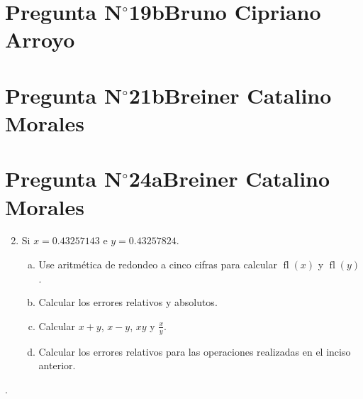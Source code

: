 \section{Pregunta N$^{\circ}$19b\qquad Bruno Cipriano Arroyo}
\section{Pregunta N$^{\circ}$21b\qquad Breiner Catalino Morales}
\section{Pregunta N$^{\circ}$24a\qquad Breiner Catalino Morales}



\begin{frame}

	\begin{enumerate}\setcounter{enumi}{1}
		\item

		      Si $x=0.43257143$ e $y=0.43257824$.

		      \begin{enumerate}[a)]
			      \item\label{q:2.a}

			      Use aritmética de redondeo a cinco cifras para calcular
			      \begin{math}
				      \operatorname{fl}\left(x\right)
			      \end{math}
			      y
			      \begin{math}
				      \operatorname{fl}\left(y\right)
			      \end{math}.

			      \item\label{q:2.b}

			      Calcular los errores relativos y absolutos.

			      \item\label{q:2.c}

			      Calcular $x+y$, $x-y$, $xy$ y $\frac{x}{y}$.

			      \item\label{q:2.d}

			      Calcular los errores relativos para las operaciones
			      realizadas en el inciso anterior.
		      \end{enumerate}
	\end{enumerate}

	\begin{solution}
		.
	\end{solution}
\end{frame}

